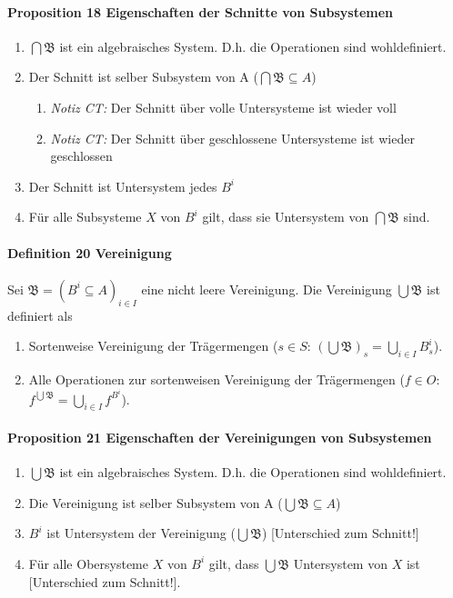 \paragraph{Proposition 18 Eigenschaften der Schnitte von Subsystemen}
\begin{enumerate}
\item $\bigcap\mathfrak{B}$ ist ein algebraisches System. D.h. die Operationen sind wohldefiniert.
\item Der Schnitt ist selber Subsystem von A ($\bigcap\mathfrak{B} \subseteq A$)
\begin{enumerate}
\item \emph{Notiz CT:} Der Schnitt über volle Untersysteme ist wieder voll
\item \emph{Notiz CT:} Der Schnitt über geschlossene Untersysteme ist wieder geschlossen
\end{enumerate}
\item Der Schnitt ist Untersystem jedes $B^i$
\item Für alle Subsysteme $X$ von $B^i$ gilt, dass sie Untersystem von $\bigcap\mathfrak{B}$ sind.
\end{enumerate}

\paragraph{Definition 20 Vereinigung}
Sei $\mathfrak{B}=\left(B^{i}\subseteq A\right)_{i\in I}$ eine nicht leere Vereinigung.
Die Vereinigung $\bigcup\mathfrak{B}$ ist definiert als 
\begin{enumerate}
\item Sortenweise Vereinigung der Trägermengen ($s\in S$: $\left(\bigcup\mathfrak{B}\right)_{s}=\bigcup_{i\in I}B_{s}^{i}$).
\item Alle Operationen zur sortenweisen Vereinigung der Trägermengen ($f\in O$: $f^{\bigcup\mathfrak{B}}=\bigcup_{i\in I}f^{B^{i}}$).
\end{enumerate}

\paragraph{Proposition 21 Eigenschaften der Vereinigungen von Subsystemen}
\begin{enumerate}
\item $\bigcup\mathfrak{B}$ ist ein algebraisches System. D.h. die Operationen sind wohldefiniert.
\item Die Vereinigung ist selber Subsystem von A ($\bigcup\mathfrak{B} \subseteq A$)
\item $B^i$ ist Untersystem der Vereinigung ($\bigcup\mathfrak{B}$) [Unterschied zum Schnitt!]
\item Für alle Obersysteme $X$ von $B^i$ gilt, dass $\bigcup\mathfrak{B}$ Untersystem von $X$ ist [Unterschied zum Schnitt!].
\end{enumerate}

